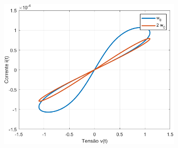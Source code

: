 \documentclass{ceel}
\begin{document}
\begin{multicols}{2}
\begin{figure}[ht]
\begin{subfigure}{0.33\textwidth}
\includegraphics[width=\columnwidth]{ww0}
\caption{} \label{pinched}
\end{subfigure}
 

\end{figure}
\end{multicols}
\end{document}
